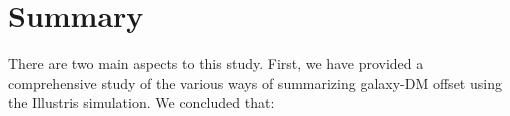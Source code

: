 
 


\section{Summary}
There are two main aspects to this study. 
First, we have provided a comprehensive study of the various ways of summarizing 
galaxy-DM offset using the Illustris simulation. We concluded that:

